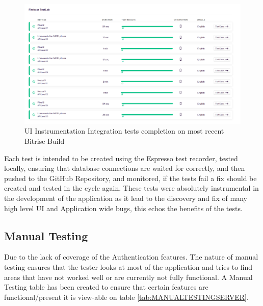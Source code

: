     \begin{figure} [htbp!]
        \centering
        \includegraphics[width=\textwidth]{Images/UI Integration Tests Bitrise.PNG}
        \caption{UI Instrumentation Integration tests completion on most recent Bitrise Build}
        \label{fig:UIIntegrationTests}
    \end{figure}
    
    Each test is intended to be created using the Espresso test recorder, tested locally, ensuring that database connections are waited for correctly, and then pushed to the GitHub Repository, and monitored, if the tests fail a fix should be created and tested in the cycle again. These tests were absolutely instrumental in the development of the application as it lead to the discovery and fix of many high level UI and Application wide bugs, this echos the benefits of the tests.
    \clearpage

    \subsection{Manual Testing}
    Due to the lack of coverage of the Authentication features. The nature of manual testing ensures that the tester looks at most of the application and tries to find areas that have not worked well or are currently not fully functional. A Manual Testing table has been created to ensure that certain features are functional/present it is view-able on table \ref{tab:MANUALTESTINGSERVER}.

